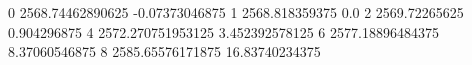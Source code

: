 0 2568.74462890625 -0.07373046875
1 2568.818359375 0.0
2 2569.72265625 0.904296875
4 2572.270751953125 3.452392578125
6 2577.18896484375 8.37060546875
8 2585.65576171875 16.83740234375
